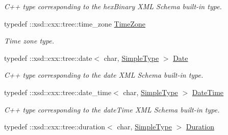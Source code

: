 \begin{DoxyCompactItemize}
\begin{DoxyCompactList}\small\item\em C++ type corresponding to the hexBinary XML Schema built-\/in type. \item\end{DoxyCompactList}\item 
\hypertarget{namespacexml__schema_a2c0cb548b6be42f0e539c80f4d111250}{
typedef ::xsd::cxx::tree::time\_\-zone \hyperlink{namespacexml__schema_a2c0cb548b6be42f0e539c80f4d111250}{TimeZone}}
\label{namespacexml__schema_a2c0cb548b6be42f0e539c80f4d111250}

\begin{DoxyCompactList}\small\item\em Time zone type. \item\end{DoxyCompactList}\item 
\hypertarget{namespacexml__schema_a1ab9f6103d1c58127c37c50226e1b19d}{
typedef ::xsd::cxx::tree::date$<$ char, \hyperlink{namespacexml__schema_a1171be9b6e593e49b895a46671f5dc5f}{SimpleType} $>$ \hyperlink{namespacexml__schema_a1ab9f6103d1c58127c37c50226e1b19d}{Date}}
\label{namespacexml__schema_a1ab9f6103d1c58127c37c50226e1b19d}

\begin{DoxyCompactList}\small\item\em C++ type corresponding to the date XML Schema built-\/in type. \item\end{DoxyCompactList}\item 
\hypertarget{namespacexml__schema_ac157d7debe19af40c06ef2330429a088}{
typedef ::xsd::cxx::tree::date\_\-time$<$ char, \hyperlink{namespacexml__schema_a1171be9b6e593e49b895a46671f5dc5f}{SimpleType} $>$ \hyperlink{namespacexml__schema_ac157d7debe19af40c06ef2330429a088}{DateTime}}
\label{namespacexml__schema_ac157d7debe19af40c06ef2330429a088}

\begin{DoxyCompactList}\small\item\em C++ type corresponding to the dateTime XML Schema built-\/in type. \item\end{DoxyCompactList}\item 
\hypertarget{namespacexml__schema_aa7bc30c31d90cae4c4cdae79c647773d}{
typedef ::xsd::cxx::tree::duration$<$ char, \hyperlink{namespacexml__schema_a1171be9b6e593e49b895a46671f5dc5f}{SimpleType} $>$ \hyperlink{namespacexml__schema_aa7bc30c31d90cae4c4cdae79c647773d}{Duration}}
\label{namespacexml__schema_aa7bc30c31d90cae4c4cdae79c647773d}


\end{DoxyCompactItemize}
